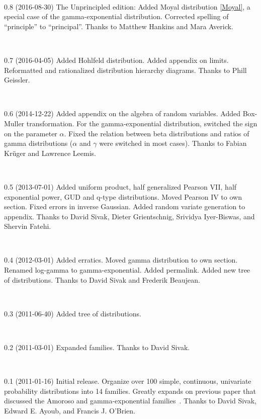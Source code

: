 {~

0.8 (2016-08-30)
The Unprincipled edition:
Added Moyal distribution \eqref{Moyal}, a special case of the gamma-exponential distribution.
Corrected spelling of ``principle'' to ``principal''. Thanks to Matthew Hankins and Mara Averick.

~

0.7 (2016-04-05) 
%
Added Hohlfeld distribution. %
Added appendix on limits.
Reformatted and rationalized distribution hierarchy diagrams. 
Thanks to Phill Geissler.

~

0.6 (2014-12-22)
%
Added appendix on the algebra of random variables.
Added Box-Muller transformation.
For the gamma-exponential distribution, switched the sign on the parameter $\alpha$.
Fixed the relation between beta distributions and ratios of gamma distributions ($\alpha$ and $\gamma$ were switched in most cases).
Thanks to Fabian Kr\"uger and Lawrence Leemis.


~


0.5 (2013-07-01)
Added uniform product, half generalized Pearson VII, half exponential power, GUD and q-type distributions. 
Moved Pearson IV to own section.
Fixed errors in inverse Gaussian.
Added random variate generation to appendix.
Thanks to David Sivak, Dieter Grientschnig, Srividya Iyer-Biswas, and Shervin Fatehi.

~

0.4 (2012-03-01) 
Added erratics. 
Moved gamma distribution to own section.
Renamed log-gamma to gamma-exponential.
Added permalink.
Added new tree of distributions. 
Thanks to David Sivak and Frederik Beaujean.

~

0.3 (2011-06-40) 
Added tree of distributions. 

~

0.2 (2011-03-01) 
Expanded families.  
Thanks to David Sivak. 

~

 0.1 (2011-01-16)
 Initial release. Organize over 100  simple, continuous, univariate probability distributions into 14 families. Greatly expands on previous paper that discussed the Amoroso and gamma-exponential families~\cite{_amoroso}. Thanks to David Sivak, Edward E. Ayoub, and Francis J. O'Brien.


}



